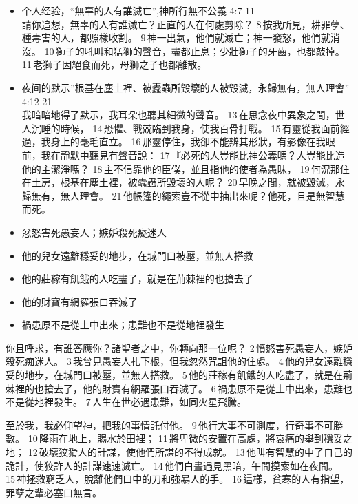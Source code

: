 \begin{itemize}
\itemsep-.45em  
\item 个人经验，“無辜的人有誰滅亡”,神所行無不公義 4:7-11\\
請你追想，無辜的人有誰滅亡？正直的人在何處剪除？ 8 按我所見，耕罪孽、種毒害的人，都照樣收割。 9 神一出氣，他們就滅亡；神一發怒，他們就消沒。 10 獅子的吼叫和猛獅的聲音，盡都止息；少壯獅子的牙齒，也都敲掉。 11 老獅子因絕食而死，母獅之子也都離散。

\item 夜间的默示''根基在塵土裡、被蠹蟲所毀壞的人被毀滅，永歸無有，無人理會'' 4:12-21\\
我暗暗地得了默示，我耳朵也聽其細微的聲音。 13 在思念夜中異象之間，世人沉睡的時候， 14 恐懼、戰兢臨到我身，使我百骨打戰。 15 有靈從我面前經過，我身上的毫毛直立。 16 那靈停住，我卻不能辨其形狀，有影像在我眼前，我在靜默中聽見有聲音說： 17 『必死的人豈能比神公義嗎？人豈能比造他的主潔淨嗎？ 18 主不信靠他的臣僕，並且指他的使者為愚昧， 19 何況那住在土房，根基在塵土裡，被蠹蟲所毀壞的人呢？ 20 早晚之間，就被毀滅，永歸無有，無人理會。 21 他帳篷的繩索豈不從中抽出來呢？他死，且是無智慧而死。
\end{itemize}

\begin{itemize}
\itemsep-.45em  
\item 忿怒害死愚妄人；嫉妒殺死癡迷人
\item 他的兒女遠離穩妥的地步，在城門口被壓，並無人搭救
\item 他的莊稼有飢餓的人吃盡了，就是在荊棘裡的也搶去了
\item 他的財寶有網羅張口吞滅了
\item 禍患原不是從土中出來；患難也不是從地裡發生
\end{itemize}
你且呼求，有誰答應你？諸聖者之中，你轉向那一位呢？ 2 憤怒害死愚妄人，嫉妒殺死痴迷人。 3 我曾見愚妄人扎下根，但我忽然咒詛他的住處。 4 他的兒女遠離穩妥的地步，在城門口被壓，並無人搭救。 5 他的莊稼有飢餓的人吃盡了，就是在荊棘裡的也搶去了，他的財寶有網羅張口吞滅了。 6 禍患原不是從土中出來，患難也不是從地裡發生。 7 人生在世必遇患難，如同火星飛騰。

至於我，我必仰望神，把我的事情託付他。 9 他行大事不可測度，行奇事不可勝數。 10 降雨在地上，賜水於田裡； 11 將卑微的安置在高處，將哀痛的舉到穩妥之地； 12 破壞狡猾人的計謀，使他們所謀的不得成就。 13 他叫有智慧的中了自己的詭計，使狡詐人的計謀速速滅亡。 14 他們白晝遇見黑暗，午間摸索如在夜間。 15 神拯救窮乏人，脫離他們口中的刀和強暴人的手。 16 這樣，貧寒的人有指望，罪孽之輩必塞口無言。


